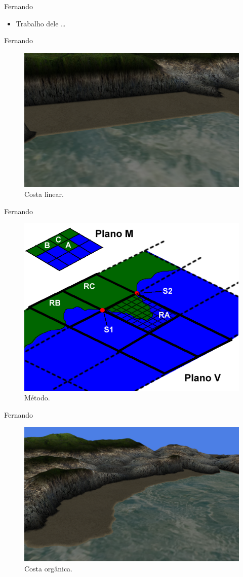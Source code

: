 \begin{frame}{Fernando}
  \begin{itemize}
        \item Trabalho dele \ldots
    \end{itemize}
\end{frame}

\begin{frame}{Fernando}
  \begin{figure}
		\centering
        \includegraphics[width=.8\textwidth]
        {img/uffs/fernando/linearcosta.png}
        \caption{Costa linear.}
  \end{figure}
\end{frame}

\begin{frame}{Fernando}
  \begin{figure}
		\centering
        \includegraphics[width=.8\textwidth]{img/uffs/fernando/metodo.png}
        \caption{Método.}
  \end{figure}
\end{frame}

\begin{frame}{Fernando}
  \begin{figure}
		\centering
        \includegraphics[width=.8\textwidth]
        {img/uffs/fernando/costaorganica.png}
        \caption{Costa orgânica.}
  \end{figure}
\end{frame}